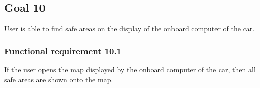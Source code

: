 \subsection{Goal 10}
User is able to find safe areas on the display of the onboard computer of the car.

\setcounter{secnumdepth}{3}
\subsubsection{Functional requirement 10.1}
If the user opens the map displayed by the onboard computer of the car, then all safe areas are shown onto the map.